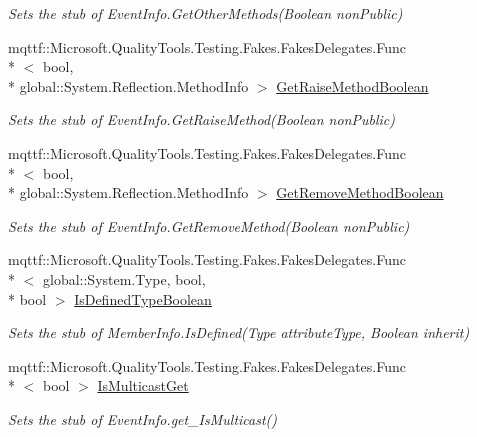 \begin{DoxyCompactItemize}
\begin{DoxyCompactList}\small\item\em Sets the stub of Event\-Info.\-Get\-Other\-Methods(\-Boolean non\-Public)\end{DoxyCompactList}\item 
mqttf\-::\-Microsoft.\-Quality\-Tools.\-Testing.\-Fakes.\-Fakes\-Delegates.\-Func\\*
$<$ bool, \\*
global\-::\-System.\-Reflection.\-Method\-Info $>$ \hyperlink{class_system_1_1_reflection_1_1_fakes_1_1_stub_event_info_a3c663627dd4e63f0e3d8ac7debdeb3f9}{Get\-Raise\-Method\-Boolean}
\begin{DoxyCompactList}\small\item\em Sets the stub of Event\-Info.\-Get\-Raise\-Method(\-Boolean non\-Public)\end{DoxyCompactList}\item 
mqttf\-::\-Microsoft.\-Quality\-Tools.\-Testing.\-Fakes.\-Fakes\-Delegates.\-Func\\*
$<$ bool, \\*
global\-::\-System.\-Reflection.\-Method\-Info $>$ \hyperlink{class_system_1_1_reflection_1_1_fakes_1_1_stub_event_info_a7766593b97bb7ad07f46929425e5463c}{Get\-Remove\-Method\-Boolean}
\begin{DoxyCompactList}\small\item\em Sets the stub of Event\-Info.\-Get\-Remove\-Method(\-Boolean non\-Public)\end{DoxyCompactList}\item 
mqttf\-::\-Microsoft.\-Quality\-Tools.\-Testing.\-Fakes.\-Fakes\-Delegates.\-Func\\*
$<$ global\-::\-System.\-Type, bool, \\*
bool $>$ \hyperlink{class_system_1_1_reflection_1_1_fakes_1_1_stub_event_info_a80ff0106f3e73004a2832250251f3120}{Is\-Defined\-Type\-Boolean}
\begin{DoxyCompactList}\small\item\em Sets the stub of Member\-Info.\-Is\-Defined(\-Type attribute\-Type, Boolean inherit)\end{DoxyCompactList}\item 
mqttf\-::\-Microsoft.\-Quality\-Tools.\-Testing.\-Fakes.\-Fakes\-Delegates.\-Func\\*
$<$ bool $>$ \hyperlink{class_system_1_1_reflection_1_1_fakes_1_1_stub_event_info_afe85e7487a8e28f19cc7da533d77698d}{Is\-Multicast\-Get}
\begin{DoxyCompactList}\small\item\em Sets the stub of Event\-Info.\-get\-\_\-\-Is\-Multicast()\end{DoxyCompactList}\item 

\end{DoxyCompactItemize}
